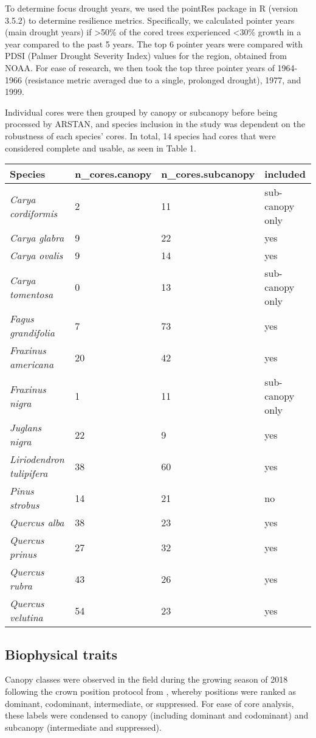 \documentclass[]{book}
\begin{document}
To determine focus drought years, we used the pointRes package in R (version 3.5.2) to determine resilience metrics. Specifically, we calculated pointer years (main drought years) if \textgreater50\% of the cored trees experienced \textless30\% growth in a year compared to the past 5 years. The top 6 pointer years were compared with PDSI (Palmer Drought Severity Index) values for the region, obtained from NOAA. For ease of research, we then took the top three pointer years of 1964-1966 (resistance metric averaged due to a single, prolonged drought), 1977, and 1999.

Individual cores were then grouped by canopy or subcanopy before being processed by ARSTAN, and species inclusion in the study was dependent on the robustness of each species' cores. In total, 14 species had cores that were considered complete and usable, as seen in Table 1.

\begin{longtable}[]{@{}llll@{}}
\toprule
\textbf{Species} & \textbf{n\_cores.canopy} & \textbf{n\_cores.subcanopy} & \textbf{included}\tabularnewline
\midrule
\endhead
\emph{Carya cordiformis} & 2 & 11 & sub-canopy only\tabularnewline
\emph{Carya glabra} & 9 & 22 & yes\tabularnewline
\emph{Carya ovalis} & 9 & 14 & yes\tabularnewline
\emph{Carya tomentosa} & 0 & 13 & sub-canopy only\tabularnewline
\emph{Fagus grandifolia} & 7 & 73 & yes\tabularnewline
\emph{Fraxinus americana} & 20 & 42 & yes\tabularnewline
\emph{Fraxinus nigra} & 1 & 11 & sub-canopy only\tabularnewline
\emph{Juglans nigra} & 22 & 9 & yes\tabularnewline
\emph{Liriodendron tulipifera} & 38 & 60 & yes\tabularnewline
\emph{Pinus strobus} & 14 & 21 & no\tabularnewline
\emph{Quercus alba} & 38 & 23 & yes\tabularnewline
\emph{Quercus prinus} & 27 & 32 & yes\tabularnewline
\emph{Quercus rubra} & 43 & 26 & yes\tabularnewline
\emph{Quercus velutina} & 54 & 23 & yes\tabularnewline
\bottomrule
\end{longtable}

\hypertarget{biophysical-traits}{%
\subsection{Biophysical traits}\label{biophysical-traits}}

Canopy classes were observed in the field during the growing season of 2018 following the crown position protocol from \citep{jennings_assessing_1999}, whereby positions were ranked as dominant, codominant, intermediate, or suppressed. For ease of core analysis, these labels were condensed to canopy (including dominant and codominant) and subcanopy (intermediate and suppressed).
\end{document}
